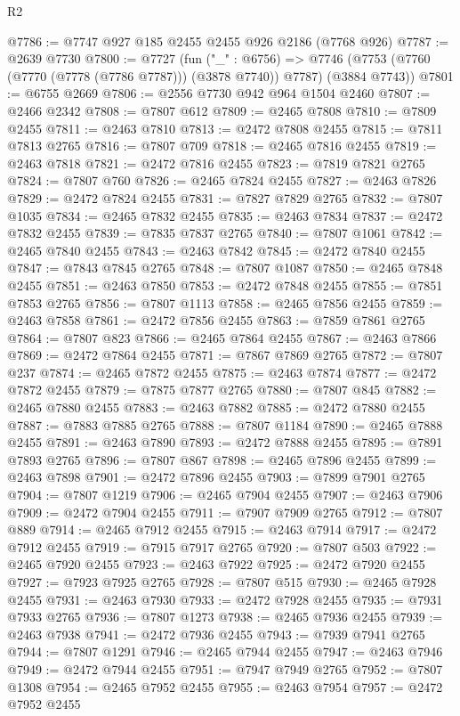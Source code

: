 \begin{lexlean}{R2}
\begin{coremodule}
@7786 := @7747 @927 @185 @2455 @2455 @926 @2186 (@7768 @926)
@7787 := @2639 @7730
@7800 := @7727
    (fun ("_" : @6756) =>
    @7746 (@7753 (@7760 (@7770 (@7778 (@7786 @7787))) (@3878 @7740)) @7787) (@3884 @7743))
@7801 := @6755 @2669
@7806 := @2556 @7730 @942 @964 @1504 @2460
@7807 := @2466 @2342
@7808 := @7807 @612
@7809 := @2465 @7808
@7810 := @7809 @2455
@7811 := @2463 @7810
@7813 := @2472 @7808 @2455
@7815 := @7811 @7813 @2765
@7816 := @7807 @709
@7818 := @2465 @7816 @2455
@7819 := @2463 @7818
@7821 := @2472 @7816 @2455
@7823 := @7819 @7821 @2765
@7824 := @7807 @760
@7826 := @2465 @7824 @2455
@7827 := @2463 @7826
@7829 := @2472 @7824 @2455
@7831 := @7827 @7829 @2765
@7832 := @7807 @1035
@7834 := @2465 @7832 @2455
@7835 := @2463 @7834
@7837 := @2472 @7832 @2455
@7839 := @7835 @7837 @2765
@7840 := @7807 @1061
@7842 := @2465 @7840 @2455
@7843 := @2463 @7842
@7845 := @2472 @7840 @2455
@7847 := @7843 @7845 @2765
@7848 := @7807 @1087
@7850 := @2465 @7848 @2455
@7851 := @2463 @7850
@7853 := @2472 @7848 @2455
@7855 := @7851 @7853 @2765
@7856 := @7807 @1113
@7858 := @2465 @7856 @2455
@7859 := @2463 @7858
@7861 := @2472 @7856 @2455
@7863 := @7859 @7861 @2765
@7864 := @7807 @823
@7866 := @2465 @7864 @2455
@7867 := @2463 @7866
@7869 := @2472 @7864 @2455
@7871 := @7867 @7869 @2765
@7872 := @7807 @237
@7874 := @2465 @7872 @2455
@7875 := @2463 @7874
@7877 := @2472 @7872 @2455
@7879 := @7875 @7877 @2765
@7880 := @7807 @845
@7882 := @2465 @7880 @2455
@7883 := @2463 @7882
@7885 := @2472 @7880 @2455
@7887 := @7883 @7885 @2765
@7888 := @7807 @1184
@7890 := @2465 @7888 @2455
@7891 := @2463 @7890
@7893 := @2472 @7888 @2455
@7895 := @7891 @7893 @2765
@7896 := @7807 @867
@7898 := @2465 @7896 @2455
@7899 := @2463 @7898
@7901 := @2472 @7896 @2455
@7903 := @7899 @7901 @2765
@7904 := @7807 @1219
@7906 := @2465 @7904 @2455
@7907 := @2463 @7906
@7909 := @2472 @7904 @2455
@7911 := @7907 @7909 @2765
@7912 := @7807 @889
@7914 := @2465 @7912 @2455
@7915 := @2463 @7914
@7917 := @2472 @7912 @2455
@7919 := @7915 @7917 @2765
@7920 := @7807 @503
@7922 := @2465 @7920 @2455
@7923 := @2463 @7922
@7925 := @2472 @7920 @2455
@7927 := @7923 @7925 @2765
@7928 := @7807 @515
@7930 := @2465 @7928 @2455
@7931 := @2463 @7930
@7933 := @2472 @7928 @2455
@7935 := @7931 @7933 @2765
@7936 := @7807 @1273
@7938 := @2465 @7936 @2455
@7939 := @2463 @7938
@7941 := @2472 @7936 @2455
@7943 := @7939 @7941 @2765
@7944 := @7807 @1291
@7946 := @2465 @7944 @2455
@7947 := @2463 @7946
@7949 := @2472 @7944 @2455
@7951 := @7947 @7949 @2765
@7952 := @7807 @1308
@7954 := @2465 @7952 @2455
@7955 := @2463 @7954
@7957 := @2472 @7952 @2455

\end{coremodule}
\end{lexlean}
